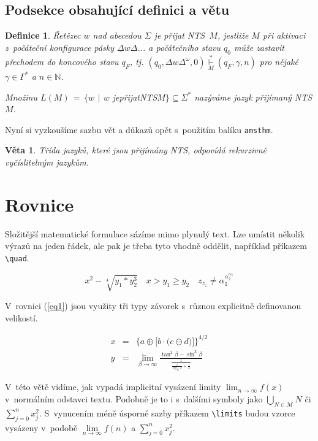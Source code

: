 \documentclass[twocolumn, 11pt, a4paper]{article}
\newtheorem{definition}{Definice}
\newtheorem{lemma}{Věta}
\begin{document}
	\subsection{Podsekce obsahující definici a větu}
		\begin{definition}
		\label{def2}
			\textnormal{Řetězec $w$ nad abecedou $\Sigma$ je přijat NTS}~$M$,
			\textit{
				jestliže $M$ při aktivaci z~počáteční konfigurace pásky
				$\underline{\Delta}w\Delta$... a počátečního stavu $q_0$ může zastavit přechodem do koncového stavu $q_F$, tj.
				$(q_0, \Delta w\Delta^{\omega}, 0) \overset{*}{\underset{M}{\vdash}} (q_F, \gamma, n)$
				pro nějaké
				$\gamma \in \Gamma^*$ a $n \in \mathbb{N}$.
			}
	
			\textit{Množinu} $L(M)\, =\, \{w\ \,|\ \,w$\!  je\;přijat\;NTS\;$M\} \subseteq \Sigma^*$ nazýváme \textnormal{jazyk přijímaný NTS} $M$.	
		\end{definition}
		Nyní si vyzkoušíme sazbu vět a důkazů opět s~použitím balíku \texttt{amsthm}.
		\begin{lemma}Třída jazyků, které jsou přijímány NTS, odpovídá \textnormal{rekurzivně vyčíslitelným jazykům.}
		\end{lemma}

\section{Rovnice}
	Složitější matematické formulace sázíme mimo plynulý text. Lze umístit několik výrazů na jeden řádek, ale pak je třeba tyto vhodně oddělit, například příkazem \verb|\quad|.
	
$$
		x^2 - \sqrt[4]{y_1 \ast y^3_{2}} \quad x > y_1 \geq y_2 \quad z_{z_z} \not= \alpha^{\alpha^{\alpha_3}_2}_1
$$

	V~rovnici (\ref{eq1}) jsou využity tři typy závorek s~různou explicitně definovanou velikostí.
	
	\begin{eqnarray}
		x &=& \bigg\{a \oplus \Big[b \cdot \big(c \ominus d \big)\Big] \bigg\}^{4/2} \label{eq1}\\
		y &=& \lim_{\beta\to\infty} \frac{\tan^2 \beta \minus \sin^3 \beta}{\frac{1}{\frac{1}{\log_{42}x} + \frac{1}{2}}}\label{eq2}
	\end{eqnarray}
	
	V~této větě vidíme, jak vypadá implicitní vysázení limity
	$\lim_{n\to\infty} f(x)$
	v~normálním odstavci textu. Podobně je to i s~dalšími symboly jako
	$\bigcup_{N \in \mathcal{M}} N$ či $\sum_{j=0}^n x^2_j$.
	S~vynucením méně úsporné sazby příkazem \verb|\limits| budou vzorce vysázeny v~podobě
	$\lim\limits_{n\to\infty} f(n)$ a $\sum\limits^n_{j=0} x^2_j$. 
\end{document}
